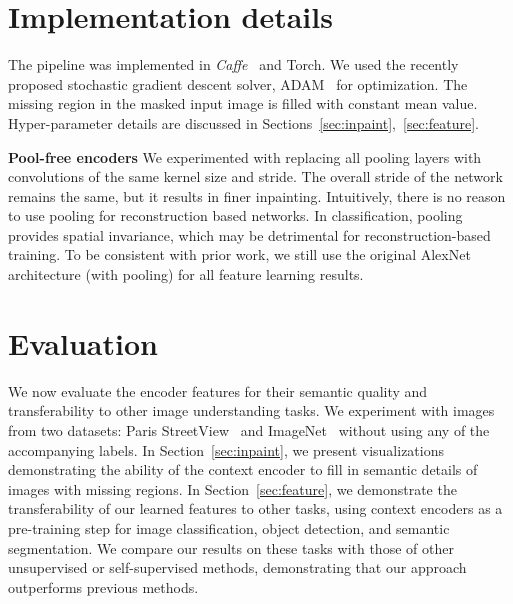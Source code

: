 \documentclass[10pt,twocolumn,letterpaper]{article}
\begin{document}
\section{Implementation details}
The pipeline was implemented in \textit{Caffe}~\cite{caffe} and Torch.
We used the recently proposed stochastic gradient descent solver, ADAM~\cite{kingma2014adam} for optimization.
The missing region in the masked input image is filled with constant mean value.
Hyper-parameter details are discussed in Sections~\ref{sec:inpaint},~\ref{sec:feature}.
%

{\bf Pool-free encoders}
We experimented with replacing all pooling layers with convolutions of the same kernel size and stride.
The overall stride of the network remains the same, but it results in finer inpainting.
Intuitively, there is no reason to use pooling for reconstruction based networks.
In classification, pooling provides spatial invariance, which may be detrimental for reconstruction-based training.
To be consistent with prior work, we still use the original AlexNet architecture (with pooling) for all feature learning results.

%
%
%

%
%
%
%
%
%
%
%
%
%
%
%
%
%
%
%
%
%
%
%
%
%
%
%
%

\section{Evaluation}
We now evaluate the encoder features for their semantic quality and transferability to other image understanding tasks.
We experiment with images from two datasets: Paris StreetView~\cite{doersch2012makes} and ImageNet~\cite{imagenet} without using any of the accompanying labels.
In Section~\ref{sec:inpaint}, we present visualizations demonstrating the ability of the context encoder to fill in semantic details of images with missing regions.
In Section~\ref{sec:feature}, we demonstrate the transferability of our learned features to other tasks, using context encoders as a pre-training step for image classification, object detection, and semantic segmentation.
We compare our results on these tasks with those of other unsupervised or self-supervised methods, demonstrating that our approach outperforms previous methods.
%
%

%
%
%
%
%
%
%
%
%
%

%
%
%
%
%
%
%
%

%
%
%
%
%
%
%
%
%
%
%

%
%
%
%
%
%
\end{document}
